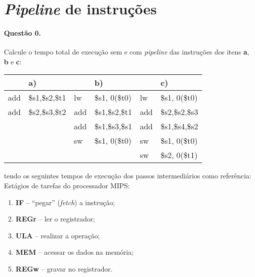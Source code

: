 \def\map#1#2{{\tt #1} $\Leftarrow$\ {\tt\$#2}}
\def\M{com acesso à memória}

\section*{{\em Pipeline} de instruções}

\paragraph{Questão 0.} Calcule o tempo total de execução sem e com {\em
  pipeline} das instruções dos itens {\bf a}, {\bf b} e {\bf c}:

\begin{center}
\begin{tt}
\begin{tabular}{|ll|ll|ll|}\hline
&{\bf a)} & &{\bf b)} & &{\bf c)}\\\hline
  add    &\$s1,\$s2,\$t1 & lw  & \$s1, 0(\$t0)  & lw  & \$s1, 0(\$t0)\\
  add    &\$s2,\$s3,\$t2 & add &\$s1,\$s2,\$t1  & add &\$s2,\$s2,\$s3\\
         &               & add &\$s1,\$s3,\$s1  & add &\$s1,\$s4,\$s2\\
         &               & sw  &\$s1, 0(\$t0)    & sw  &\$s1, 0(\$t0)\\
         &               &     &                & sw  &\$s2, 0(\$t1)\\\hline
       \end{tabular}
     \end{tt}         
   \end{center}                  
                 
\bigskip
\noindent tendo os seguintes tempos de execução dos passos intermediários
como referência:\\

Estágios de tarefas do processador MIPS:
\begin{enumerate}
\item {\bf IF} -- ``pegar'' ({\em fetch}) a instrução;
\item {\bf REGr} -- ler o registrador;
\item {\bf ULA} -- realizar a operação;
\item {\bf MEM} -- acessar os dados na memória;
\item {\bf REGw} -- gravar no registrador.
\end{enumerate}
\bigskip

